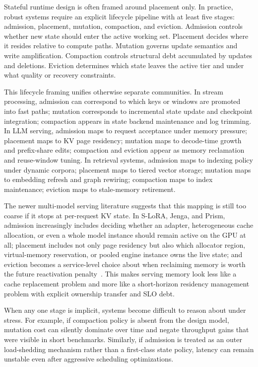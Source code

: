 \documentclass[acmsmall,screen,review]{acmart}
\begin{document}
Stateful runtime design is often framed around placement only. In practice, robust systems require an explicit lifecycle pipeline with at least five stages: admission, placement, mutation, compaction, and eviction. Admission controls whether new state should enter the active working set. Placement decides where it resides relative to compute paths. Mutation governs update semantics and write amplification. Compaction controls structural debt accumulated by updates and deletions. Eviction determines which state leaves the active tier and under what quality or recovery constraints.

This lifecycle framing unifies otherwise separate communities. In stream processing, admission can correspond to which keys or windows are promoted into fast paths; mutation corresponds to incremental state update and checkpoint integration; compaction appears in state backend maintenance and log trimming. In LLM serving, admission maps to request acceptance under memory pressure; placement maps to KV page residency; mutation maps to decode-time growth and prefix-share edits; compaction and eviction appear as memory reclamation and reuse-window tuning. In retrieval systems, admission maps to indexing policy under dynamic corpora; placement maps to tiered vector storage; mutation maps to embedding refresh and graph rewiring; compaction maps to index maintenance; eviction maps to stale-memory retirement.

The newer multi-model serving literature suggests that this mapping is still too coarse if it stops at per-request KV state. In S-LoRA, Jenga, and Prism, admission increasingly includes deciding whether an adapter, heterogeneous cache allocation, or even a whole model instance should remain active on the GPU at all; placement includes not only page residency but also which allocator region, virtual-memory reservation, or pooled engine instance owns the live state; and eviction becomes a service-level choice about when reclaiming memory is worth the future reactivation penalty~\cite{sheng2023slora,zhang2025jenga,yu2025prism}. This makes serving memory look less like a cache replacement problem and more like a short-horizon residency management problem with explicit ownership transfer and SLO debt.

When any one stage is implicit, systems become difficult to reason about under stress. For example, if compaction policy is absent from the design model, mutation cost can silently dominate over time and negate throughput gains that were visible in short benchmarks. Similarly, if admission is treated as an outer load-shedding mechanism rather than a first-class state policy, latency can remain unstable even after aggressive scheduling optimizations.
\end{document}
